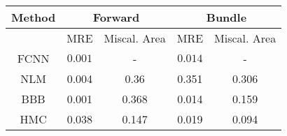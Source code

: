 \documentclass[convert={outext=.png}]{standalone}
\begin{document}
\centering
\label{tab:experimental_results}



\begin{tabular}{c c c c c}
\hline
\hline
Method &  \multicolumn{2}{c}{Forward} & \multicolumn{2}{c}{Bundle} \\ \hline
 & MRE & Miscal. Area & MRE & Miscal. Area\\
 FCNN & $\mathbf{0.001}$ & - & $\mathbf{0.014}$ & - \\
 \hline
 NLM & 0.004 & 0.36 & 0.351 & 0.306 \\
 BBB & 0.001 & 0.368 & 0.014 & 0.159 \\
 HMC & 0.038 & 0.147 & 0.019 & 0.094 \\
\hline
\hline
\end{tabular}
\end{document}
